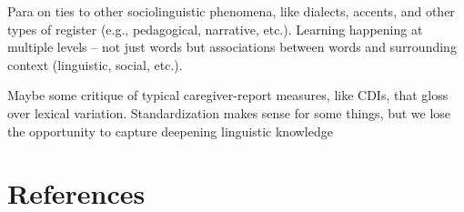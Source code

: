 \documentclass[10pt, letterpaper]{article}
\begin{document}
Para on ties to other sociolinguistic phenomena, like dialects, accents,
and other types of register (e.g., pedagogical, narrative, etc.).
Learning happening at multiple levels -- not just words but associations
between words and surrounding context (linguistic, social, etc.).

Maybe some critique of typical caregiver-report measures, like CDIs,
that gloss over lexical variation. Standardization makes sense for some
things, but we lose the opportunity to capture deepening linguistic
knowledge

\hypertarget{references}{%
\section{References}\label{references}}

\setlength{\parindent}{-0.1in} 
\setlength{\leftskip}{0.125in}

\noindent
\end{document}
